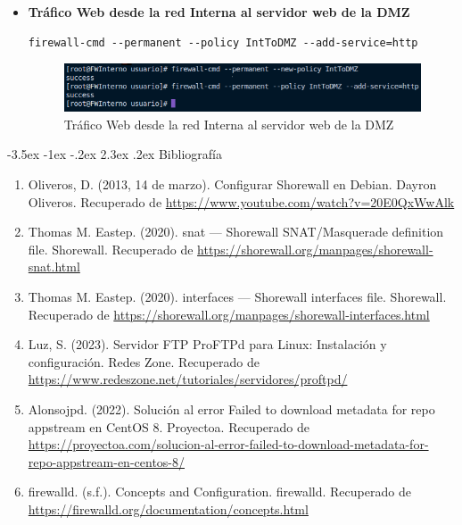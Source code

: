 \documentclass[11pt]{report}
\makeatletter
\renewcommand\chapter{\@startsection{chapter}{0}{\z@}%
    {-3.5ex \@plus -1ex \@minus -.2ex}%
    {2.3ex \@plus.2ex}%
    {\normalfont\Large\bfseries}}
\makeatother
\begin{document}
\begin{itemize}

  \item \textbf{Tráfico Web desde la red Interna al servidor web de la DMZ}
  \begin{verbatim}
firewall-cmd --permanent --policy IntToDMZ --add-service=http
  \end{verbatim}
  \begin{figure}[H]
    \centering
    \includegraphics[scale=0.655]{img/http.png}
    \caption{Tráfico Web desde la red Interna al servidor web de la DMZ}
  \end{figure}


\end{itemize}

\cleardoublepage

\chapter{Bibliografía} %
\begin{enumerate}
\item Oliveros, D. (2013, 14 de marzo). Configurar Shorewall en Debian. Dayron Oliveros. Recuperado de \url{https://www.youtube.com/watch?v=20E0QxWwAlk}
\item Thomas M. Eastep. (2020). snat — Shorewall SNAT/Masquerade definition file. Shorewall. Recuperado de \url{https://shorewall.org/manpages/shorewall-snat.html}
\item Thomas M. Eastep. (2020). interfaces — Shorewall interfaces file. Shorewall. Recuperado de \url{https://shorewall.org/manpages/shorewall-interfaces.html}
\item Luz, S. (2023). Servidor FTP ProFTPd para Linux: Instalación y configuración. Redes Zone. Recuperado de \url{https://www.redeszone.net/tutoriales/servidores/proftpd/}
\item Alonsojpd. (2022). Solución al error Failed to download metadata for repo appstream en CentOS 8. Proyectoa. Recuperado de \url{https://proyectoa.com/solucion-al-error-failed-to-download-metadata-for-repo-appstream-en-centos-8/}
\item firewalld. (s.f.). Concepts and Configuration. firewalld. Recuperado de \url{https://firewalld.org/documentation/concepts.html}
\end{enumerate}
\end{document}
